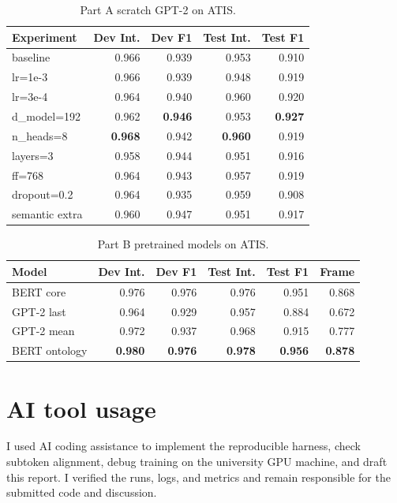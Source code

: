 \documentclass[a4paper]{article}
\begin{document}
\begin{table}[t]
\centering
\small
\caption{Part A scratch GPT-2 on ATIS.}
\label{tab:nlu-scratch}
\begin{tabular}{lrrrr}
\hline
Experiment & Dev Int. & Dev F1 & Test Int. & Test F1 \\
\hline
baseline & 0.966 & 0.939 & 0.953 & 0.910 \\
lr=1e-3 & 0.966 & 0.939 & 0.948 & 0.919 \\
lr=3e-4 & 0.964 & 0.940 & 0.960 & 0.920 \\
d\_model=192 & 0.962 & \textbf{0.946} & 0.953 & \textbf{0.927} \\
n\_heads=8 & \textbf{0.968} & 0.942 & \textbf{0.960} & 0.919 \\
layers=3 & 0.958 & 0.944 & 0.951 & 0.916 \\
ff=768 & 0.964 & 0.943 & 0.957 & 0.919 \\
dropout=0.2 & 0.964 & 0.935 & 0.959 & 0.908 \\
semantic extra & 0.960 & 0.947 & 0.951 & 0.917 \\
\hline
\end{tabular}
\end{table}

\begin{table}[t]
\centering
\small
\caption{Part B pretrained models on ATIS.}
\label{tab:nlu-pretrained}
\begin{tabular}{lrrrrr}
\hline
Model & Dev Int. & Dev F1 & Test Int. & Test F1 & Frame \\
\hline
BERT core & 0.976 & 0.976 & 0.976 & 0.951 & 0.868 \\
GPT-2 last & 0.964 & 0.929 & 0.957 & 0.884 & 0.672 \\
GPT-2 mean & 0.972 & 0.937 & 0.968 & 0.915 & 0.777 \\
BERT ontology & \textbf{0.980} & \textbf{0.976} & \textbf{0.978} & \textbf{0.956} & \textbf{0.878} \\
\hline
\end{tabular}
\end{table}

\section*{AI tool usage}
I used AI coding assistance to implement the reproducible harness, check subtoken alignment, debug training on the university GPU machine, and draft this report. I verified the runs, logs, and metrics and remain responsible for the submitted code and discussion.



\end{document}

